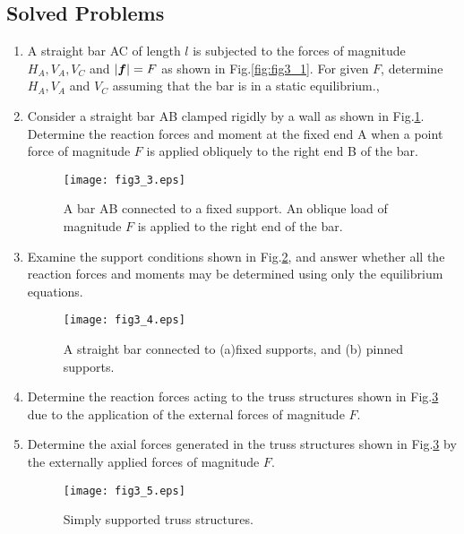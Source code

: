 \documentclass[10pt,a4j]{article}
\begin{document}
\subsection{Solved Problems}
\begin{enumerate}
\item
A straight bar AC of length $l$ is subjected to the forces of magnitude  
$H_A, V_A, V_C$ and $|\mbox{\boldmath $f$}|=F$ as shown in Fig.\ref{fig:fig3_1}. 
For given $F$, determine $H_A, V_A$ and $V_C$ assuming that the bar is in a static equilibrium.,
\item
Consider a straight bar AB clamped rigidly by a wall as shown in Fig.\ref{fig:fig3_3}.
Determine the reaction forces and moment at the fixed end A  when 
a point force of magnitude $F$ is applied obliquely to the right end B of the bar.  
\begin{figure}[h]
	\begin{center}
	\texttt{[image: fig3\_3.eps]} 
	\end{center}
	\caption{A bar AB connected to a fixed support. 
	An oblique load of magnitude $F$ is applied to the right end of the bar.} 
	\label{fig:fig3_3}
\end{figure}
\item
Examine the support conditions shown in Fig.\ref{fig:fig3_4}, and answer whether 
all the reaction forces and moments may be determined using only the equilibrium equations. 
\begin{figure}[h]
	\begin{center}
	\texttt{[image: fig3\_4.eps]} 
	\end{center}
	\caption{A straight bar connected to (a)fixed supports, and (b) pinned supports.} 
	\label{fig:fig3_4}
\end{figure}
\item
Determine the reaction forces acting to the truss structures shown in Fig.\ref{fig:fig3_5} 
due to the application of the external forces of magnitude $F$.
\item
Determine the axial forces generated in the truss structures shown in Fig.\ref{fig:fig3_5}
by the externally applied forces of magnitude $F$.
\begin{figure}[h]
	\begin{center}
	\texttt{[image: fig3\_5.eps]} 
	\end{center}
	\caption{Simply supported truss structures.} 
	\label{fig:fig3_5}
\end{figure}
\end{enumerate}
\end{document}
